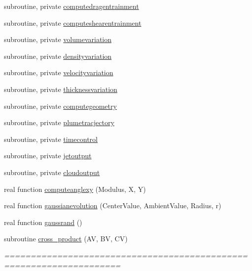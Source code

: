 \begin{DoxyCompactItemize}
subroutine, private \mbox{\hyperlink{namespacemodulejet_a8bbbce93ba8d9ba74525873c550cdf8b}{computedragentrainment}}
\item 
subroutine, private \mbox{\hyperlink{namespacemodulejet_a21b954c77f4addf0f268edc0e9448a18}{computeshearentrainment}}
\item 
subroutine, private \mbox{\hyperlink{namespacemodulejet_abe8dc92537467b9dcd97c4a01b77f51c}{volumevariation}}
\item 
subroutine, private \mbox{\hyperlink{namespacemodulejet_a05449786a790959e45db1fc1bd9f93f6}{densityvariation}}
\item 
subroutine, private \mbox{\hyperlink{namespacemodulejet_a4aaeebe926aea33dd1391746d2cdaa32}{velocityvariation}}
\item 
subroutine, private \mbox{\hyperlink{namespacemodulejet_a5241bdca6d72d79d96fdc8d9b63a291a}{thicknessvariation}}
\item 
subroutine, private \mbox{\hyperlink{namespacemodulejet_a0d3bcdd114f549e27a46b673224a1f35}{computegeometry}}
\item 
subroutine, private \mbox{\hyperlink{namespacemodulejet_a9175197cbe465e40fa03bc6a7c788871}{plumetracjectory}}
\item 
subroutine, private \mbox{\hyperlink{namespacemodulejet_a7518a8afbcafcfeedfc10f5a3a205b33}{timecontrol}}
\item 
subroutine, private \mbox{\hyperlink{namespacemodulejet_a200bdafc097359afe09ed14b7a55d8b7}{jetoutput}}
\item 
subroutine, private \mbox{\hyperlink{namespacemodulejet_a61dad6f878bf6cce690b9523901012ac}{cloudoutput}}
\item 
real function \mbox{\hyperlink{namespacemodulejet_adbbd50d3810071999488736815c23285}{computeanglexy}} (Modulus, X, Y)
\item 
real function \mbox{\hyperlink{namespacemodulejet_a54205285b4f5a4d3d7204aa240f92d64}{gaussianevolution}} (Center\+Value, Ambient\+Value, Radius, r)
\item 
real function \mbox{\hyperlink{namespacemodulejet_a5b1cd3a55b2e6494e998c7233db5ec58}{gaussrand}} ()
\item 
subroutine \mbox{\hyperlink{namespacemodulejet_a2cbc865fd41278d7ee8a6b0036bc3114}{cross\+\_\+product}} (AV, BV, CV)
\begin{DoxyCompactList}\small\item\em ==================================================================== \end{DoxyCompactList}\item 

\end{DoxyCompactItemize}
